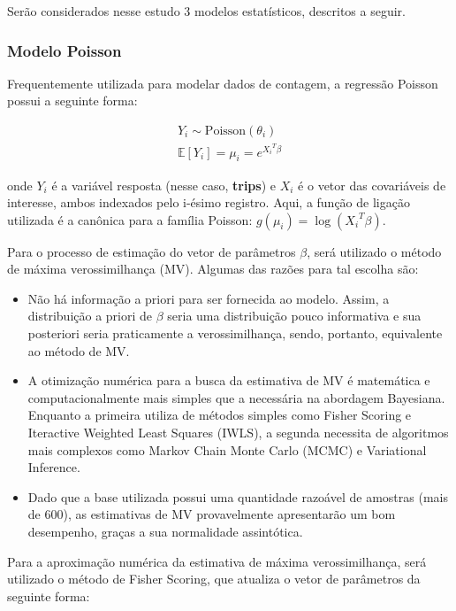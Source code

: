 \documentclass[
  twocolumn]{article}
\begin{document}
Serão considerados nesse estudo 3 modelos estatísticos, descritos a
seguir.

\subsubsection{Modelo Poisson}\label{modelo-poisson}

Frequentemente utilizada para modelar dados de contagem, a regressão
Poisson possui a seguinte forma:

\[
\begin{array}{c}
Y_i \sim \text{Poisson}(\theta_i) \\
\mathbb{E}[Y_i] = \mu_i = e^{{X_i}^T\beta}
\end{array}
\]

onde \(Y_i\) é a variável resposta (nesse caso, \textbf{trips}) e
\(X_i\) é o vetor das covariáveis de interesse, ambos indexados pelo
i-ésimo registro. Aqui, a função de ligação utilizada é a canônica para
a família Poisson: \(g(\mu_i) = \log({X_i}^T\beta)\).

Para o processo de estimação do vetor de parâmetros \(\beta\), será
utilizado o método de máxima verossimilhança (MV). Algumas das razões
para tal escolha são:

\begin{itemize}
\item
  Não há informação a priori para ser fornecida ao modelo. Assim, a
  distribuição a priori de \(\beta\) seria uma distribuição pouco
  informativa e sua posteriori seria praticamente a verossimilhança,
  sendo, portanto, equivalente ao método de MV.
\item
  A otimização numérica para a busca da estimativa de MV é matemática e
  computacionalmente mais simples que a necessária na abordagem
  Bayesiana. Enquanto a primeira utiliza de métodos simples como Fisher
  Scoring e Iteractive Weighted Least Squares (IWLS), a segunda
  necessita de algoritmos mais complexos como Markov Chain Monte Carlo
  (MCMC) e Variational Inference.
\item
  Dado que a base utilizada possui uma quantidade razoável de amostras
  (mais de 600), as estimativas de MV provavelmente apresentarão um bom
  desempenho, graças a sua normalidade assintótica.
\end{itemize}

Para a aproximação numérica da estimativa de máxima verossimilhança,
será utilizado o método de Fisher Scoring, que atualiza o vetor de
parâmetros da seguinte forma:
\end{document}
